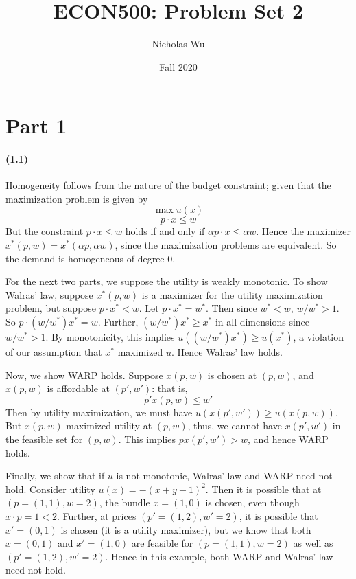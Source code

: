 \documentclass[10pt,letter]{article}
\begin{document}


\title{ECON500: Problem Set 2}

\author{Nicholas Wu}

\date{Fall 2020}

\maketitle


\section*{Part 1}

\paragraph{(1.1)}
Homogeneity follows from the nature of the budget constraint; given that the maximization problem is given by
\[ \max u(x) \]
\[ p \cdot x \le w \]
But the constraint $p \cdot x \le w$ holds if and only if $\alpha p \cdot x \le \alpha w$. Hence the maximizer $x^*(p,w) = x^*(\alpha p, \alpha w)$, since the maximization problems are equivalent. So the demand is homogeneous of degree 0.

For the next two parts, we suppose the utility is weakly monotonic.
To show Walras' law, suppose $x^*(p,w)$ is a maximizer for the utility maximization problem, but suppose $p\cdot x^* < w$. Let $p\cdot x^* = w^*$. Then since $w^* < w$, $w/w^* > 1$. So $p \cdot (w/w^*)x^* = w$. Further, $(w/w^*) x^* \ge x^*$ in all dimensions since $w/w^* > 1$. By monotonicity, this implies $u((w/w^*) x^*) \ge u(x^*)$, a violation of our assumption that $x^*$ maximized $u$. Hence Walras' law holds.

Now, we show WARP holds. Suppose $x(p,w)$ is chosen at $(p,w)$, and $x(p,w)$ is affordable at $(p',w')$: that is,
\[ p' x(p,w) \le w' \]
Then by utility maximization, we must have $u(x(p',w')) \ge u(x(p,w))$. But $x(p,w)$ maximized utility at $(p,w)$, thus, we cannot have $x(p',w')$ in the feasible set for $(p,w)$. This implies $px(p',w') > w$, and hence WARP holds.

Finally, we show that if $u$ is not monotonic, Walras' law and WARP need not hold. Consider utility $u(x) = -(x+ y - 1)^2$. Then it is possible that at $(p=(1,1), w=2)$, the bundle $x = (1,0)$ is chosen, even though $x\cdot p = 1 < 2$. Further, at prices $(p'=(1, 2), w'=2)$, it is possible that $x' = (0,1)$ is chosen (it is a utility maximizer), but we know that both $x=(0,1)$ and $x'=(1,0)$ are feasible for $(p=(1,1), w=2)$ as well as $(p'=(1,2), w'=2)$. Hence in this example, both WARP and Walras' law need not hold.
\end{document}

